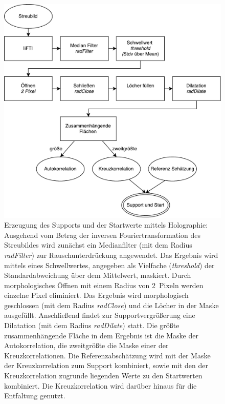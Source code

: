 \begin{figure}
	\centering
	\includegraphics[width=.65\textwidth]{images/flow_holosupport.pdf}
	\caption[Support mittels Holographie]{Erzeugung des Supports und der Startwerte mittels Holographie: Ausgehend vom Betrag der inversen Fouriertransformation des Streubildes wird zunächst ein Medianfilter (mit dem Radius \textit{radFilter}) zur Rauschunterdrückung angewendet. Das Ergebnis wird mittels eines Schwellwertes, angegeben als Vielfache (\textit{threshold}) der Standardabweichung über dem Mittelwert, maskiert. Durch morphologisches Öffnen mit einem Radius von \SI{2}{Pixeln} werden einzelne Pixel eliminiert. Das Ergebnis wird morphologisch geschlossen (mit dem Radius \textit{radClose}) und die Löcher in der Maske ausgefüllt. Anschließend findet zur Supportvergrößerung eine Dilatation (mit dem Radius \textit{radDilate}) statt. Die größte zusammenhängende Fläche in dem Ergebnis ist die Maske der Autokorrelation, die zweitgrößte die Maske einer der Kreuzkorrelationen. Die Referenzabschätzung wird mit der Maske der Kreuzkorrelation zum Support kombiniert, sowie mit den der Kreuzkorrelation zugrunde liegenden Werte zu den Startwerten kombiniert. Die Kreuzkorrelation wird darüber hinaus für die Entfaltung genutzt.}
	\label{fig:flow_holosupport}
\end{figure} 

